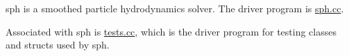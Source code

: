 sph is a smoothed particle hydrodynamics solver. \-The driver program is \hyperlink{sph_8cc}{sph.\-cc}.

\-Associated with sph is \hyperlink{tests_8cc}{tests.\-cc}, which is the driver program for testing classes and structs used by sph. 